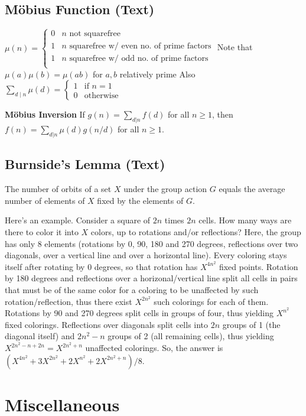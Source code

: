 \documentclass[10pt]{extarticle}
\begin{document}
\begin{multicols*}{3}
\subsection{M\"obius Function (Text)} %
$\mu(n) = \begin{cases}
0 & \text{$n$ not squarefree} \\
1 & \text{$n$ squarefree w/ even no. of prime factors} \\
1 & \text{$n$ squarefree w/ odd no. of prime factors} \\
\end{cases}$
Note that $\mu(a) \mu(b) = \mu(ab)$ for $a, b$ relatively prime
Also $\sum_{d \mid n} \mu(d) = \begin{cases} 1 & \text{if $n = 1$} \\
0 & \text{otherwise} \end{cases}$

\textbf{M\"obius Inversion}
If $g(n) = \sum_{d|n} f(d)$ for all $n \ge 1$, then
$f(n) = \sum_{d|n} \mu(d)g(n/d)$ for all $n \ge 1$.

\subsection{Burnside's Lemma (Text)} %
The number of orbits of a set $X$ under the group action $G$ equals the average
number of elements of $X$ fixed by the elements of $G$.

Here's an example. Consider a square of $2n$ times $2n$ cells. How many ways
are there to color it into $X$ colors, up to rotations and/or reflections?
Here, the group has only 8 elements (rotations by 0, 90, 180 and 270 degrees,
reflections over two diagonals, over a vertical line and over a horizontal
line). Every coloring stays itself after rotating by 0 degrees, so that
rotation has $X^{4n^2}$ fixed points. Rotation by 180 degrees and reflections
over a horizonal/vertical line split all cells in pairs that must be of the
same color for a coloring to be unaffected by such rotation/reflection, thus
there exist $X^{2n^2}$ such colorings for each of them. Rotations by 90 and 270
degrees split cells in groups of four, thus yielding $X^{n^2}$ fixed colorings.
Reflections over diagonals split cells into $2n$ groups of 1 (the diagonal
itself) and $2n^2-n$ groups of 2 (all remaining cells), thus yielding
$X^{2n^2-n+2n}=X^{2n^2+n}$ unaffected colorings.  So, the answer is
$(X^{4n^2}+3X^{2n^2}+2X^{n^2}+2X^{2n^2+n})/8$.


\section{Miscellaneous}


\end{multicols*}
\end{document}
